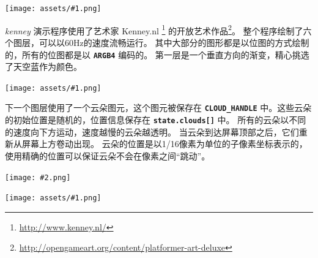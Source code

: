 \documentclass[10pt]{book}
\newcommand{\png}[1]{
\begin{center}
\texttt{[image: assets/\#1.png]}
\end{center}
}
\newcommand{\szpng}[2]{
\begin{center}
\texttt{[image: \#2.png]}
\end{center}
}
\newcommand{\mach}[1]{\texttt{\textbf{#1}}}
\begin{document}
\begin{CJK}{UTF8}{gkai}
\png{kenney}

\textit{kenney} 演示程序使用了艺术家 Kenney.nl
\footnote{\url{http://www.kenney.nl/}}
的开放艺术作品\footnote{\url{http://opengameart.org/content/platformer-art-deluxe}}。
整个程序绘制了六个图层，可以以60Hz的速度流畅运行。
其中大部分的图形都是以位图的方式绘制的，所有的位图都是以 \mach{ARGB4} 编码的。
第一层是一个垂直方向的渐变，精心挑选了天空蓝作为颜色。

\png{kenney_0}

\noindent
下一个图层使用了一个云朵图元，这个图元被保存在 \mach{CLOUD\_HANDLE} 中。这些云朵的初始位置是随机的，位置信息保存在 \mach{state.clouds[]} 中。
所有的云朵以不同的速度向下方运动，速度越慢的云朵越透明。
当云朵到达屏幕顶部之后，它们重新从屏幕上方卷动出现。
云朵的位置是以1/16像素为单位的子像素坐标表示的，使用精确的位置可以保证云朵不会在像素之间``跳动''。

\szpng{0.2}{previews/kenney-CLOUD-00}
\png{kenney_1}



\end{CJK}
\end{document}
